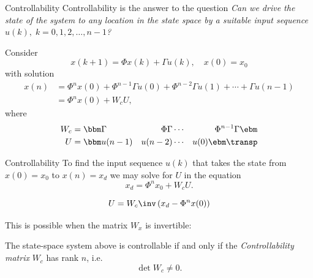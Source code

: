 \documentclass[presentation,aspectratio=1610]{beamer}
\begin{document}
\begin{frame}[label={sec:orgcb694f3}]{Controllability}
Controllability is the answer to the question \emph{Can we drive the state of the system to any location in the state space by a suitable input sequence \(u(k),\; k=0,1,2,\ldots,n-1\)?}

Consider
\[ x(k+1) = \Phi x(k) + \Gamma u(k), \quad x(0)= x_0 \]
with solution
\begin{equation}
\begin{split}
x(n) &= \Phi^nx(0) + \Phi^{n-1}\Gamma u(0) + \Phi^{n-2}\Gamma u(1) + \cdots + \Gamma u(n-1)\\
     &= \Phi^nx(0) + W_c U, 
\end{split}
\end{equation}
where
\begin{align*}
W_c &= \bbm \Gamma & \Phi\Gamma & \cdots & \Phi^{n-1}\Gamma\ebm\\
U &= \bbm u(n-1) & u(n-2) & \cdots & u(0) \ebm\transp
\end{align*}
\end{frame}

\begin{frame}[label={sec:orge71ee18}]{Controllability}
To find the input sequence \(u(k)\) that takes the state from  \(x(0)=x_0\) to \(x(n) = x_d\) we may solve for \(U\) in the equation
\[ x_d = \Phi^nx_0 + W_cU.\]

\[ U = W_c\inv \left(x_d - \Phi^nx(0)\right) \]

This is possible when the matrix \(W_x\) is \alert{invertible}:

The state-space system above is controllable if and only if the \emph{Controllability matrix} \(W_c\)  has rank \(n\), i.e. 
\[ \det W_c \neq 0.\]
\end{frame}
\end{document}
